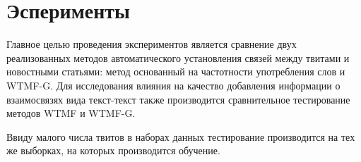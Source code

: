 \section{Эсперименты}
    Главное целью проведения экспериментов является сравнение двух реализованных методов автоматического установления связей между твитами и новостными статьями:
    метод основанный на частотности употребления слов и WTMF-G.
    Для исследования влияния на качество добавления информации о взаимосвязях вида текст-текст также производится сравнительное тестирование методов WTMF и WTMF-G.

    Ввиду малого числа твитов в наборах данных тестирование производится на тех же выборках, на которых производится обучение.

    
    
    
    


